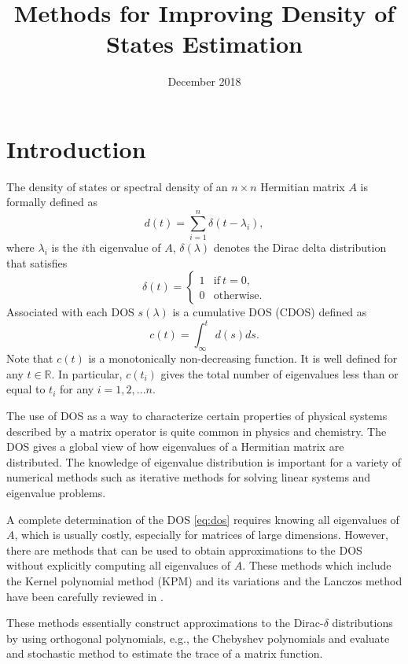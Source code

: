 \documentclass{article}
\title{Methods for Improving Density of States Estimation}
\author{ }
\date{December 2018}
\begin{document}
\maketitle

\section{Introduction}
The density of states or spectral density of an $n\times n$ Hermitian matrix $A$ is formally defined as 
\begin{equation}
d(t) = \sum_{i=1}^n \delta(t-\lambda_i),
\label{eq:dos}
\end{equation}
where $\lambda_i$ is the $i$th eigenvalue of $A$, $\delta(\lambda)$ denotes the Dirac delta distribution that satisfies
\[
\delta(t)=\left\{ 
\begin{array}{cc}
1 & \mathrm{if} \: t = 0, \\
0 & \mathrm{otherwise.}
\end{array}
\right.
\]
Associated with each DOS $s(\lambda)$ is a cumulative DOS (CDOS) defined as
\begin{equation}
    c(t) = \int_{\infty}^t d(s) ds.
\end{equation}
Note that $c(t)$ is a monotonically non-decreasing function. It is well defined for any $t \in \mathbb{R}$. In particular, $c(t_i)$ gives the total number of eigenvalues less than or equal to $t_i$ for any $i=1,2,...n$.

The use of DOS as a way to characterize certain properties of physical systems described by a matrix operator is quite common in physics and chemistry.  The DOS gives a global view of how eigenvalues of a Hermitian matrix are distributed. The knowledge of eigenvalue distribution is important for a variety of numerical methods such as iterative methods for solving linear systems and eigenvalue problems.

A complete determination of the DOS \eqref{eq:dos} requires knowing all eigenvalues of $A$, which is usually costly, especially for matrices of large dimensions.  However, there are methods that can be used to obtain approximations to the DOS without explicitly computing all eigenvalues of $A$.  These methods which include the Kernel polynomial method (KPM) \cite{kpmsurvey2006} and its variations and the Lanczos method \cite{Lanczos1988} have been carefully reviewed in \cite{LSY}. 

These methods essentially construct approximations to the Dirac-$\delta$ distributions by using orthogonal polynomials, e.g., the Chebyshev polynomials and evaluate and stochastic method to estimate the trace of a matrix function.
\end{document}
